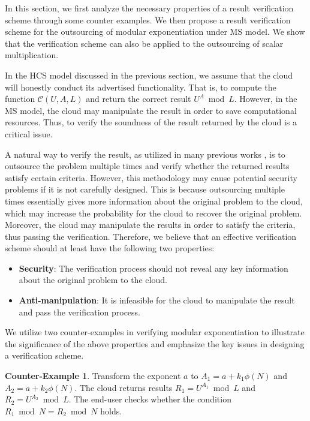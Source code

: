 \documentclass[english,draftcls,onecolumn,11pt]{IEEEtran}
\theoremstyle{definition}
\theoremstyle{plain}
\theoremstyle{plain}
\theoremstyle{definition}
\newtheorem{ctexample}{Counter-Example}
\begin{document}
In this section, we first analyze the necessary properties of a result
verification scheme through some counter examples. We then propose
a result verification scheme for the outsourcing of modular exponentiation
under MS model. We show that the verification scheme can also be applied
to the outsourcing of scalar multiplication.

In the HCS model discussed in the previous section, we assume that
the cloud will honestly conduct its advertised functionality. That
is, to compute the function $\mathcal{C}(U,A,L)$ and return the correct
result $U^{A}\bmod L$. However, in the MS model, the cloud may manipulate
the result in order to save computational resources. Thus, to verify
the soundness of the result returned by the cloud is a critical issue.

A natural way to verify the result, as utilized in many previous works
\cite{chen2012new,chen2014efficient,hohenberger2005securely}, is
to outsource the problem multiple times and verify whether the returned
results satisfy certain criteria. However, this methodology may cause
potential security problems if it is not carefully designed. This
is because outsourcing multiple times essentially gives more information
about the original problem to the cloud, which may increase the probability
for the cloud to recover the original problem. Moreover, the cloud
may manipulate the results in order to satisfy the criteria, thus
passing the verification. Therefore, we believe that an effective
verification scheme should at least have the following two properties: 
\begin{itemize}
\item \textbf{Security}: The verification process should not reveal any
key information about the original problem to the cloud. 
\item \textbf{Anti-manipulation}: It is infeasible for the cloud to manipulate
the result and pass the verification process. 
\end{itemize}
We utilize two counter-examples in verifying modular exponentiation
to illustrate the significance of the above properties and emphasize
the key issues in designing a verification scheme. 

\begin{ctexample}
Transform the exponent $a$  to $A_1=a+k_{1}\phi(N)$ and $A_2=a+k_{2}\phi(N)$. The cloud returns results $R_1=U^{A_{1}}\bmod L$ and $R_2=U^{A_2}\bmod L$. The end-user checks whether the condition  $R_1\bmod N=R_2\bmod N$ holds.  
\end{ctexample}
\end{document}
